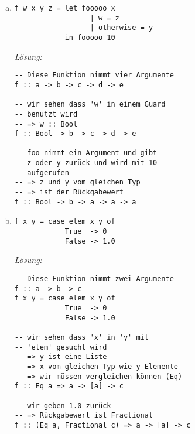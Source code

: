 \documentclass{article}
\begin{document}
\begin{enumerate} [a)]
\begin{mdframed}[backgroundcolor=bg]
\begin{verbatim}
-- wir sehen dass aus 'y' Elemente
-- rausgezogen werden (z <- y)
-- => y ist eine Liste
f :: a -> [b] -> c

-- wir benutzen modulo auf x und z
-- => beide von Integral
-- => gleicher Typ
f :: Integral a => a -> [a] -> c

-- Wir geben eine Liste zurück mit
-- Elementen aus 'y'
f :: Integral a => a -> [a] -> [a]
         \end{verbatim}
    \end{mdframed}

\newpage

    \item \begin{verbatim}
f w x y z = let fooooo x
                  | w = z
                  | otherwise = y
            in fooooo 10
          \end{verbatim}

    \textit{Lösung:}
    \begin{mdframed}[backgroundcolor=bg]
        \begin{verbatim}
-- Diese Funktion nimmt vier Argumente
f :: a -> b -> c -> d -> e

-- wir sehen dass 'w' in einem Guard
-- benutzt wird
-- => w :: Bool
f :: Bool -> b -> c -> d -> e

-- foo nimmt ein Argument und gibt
-- z oder y zurück und wird mit 10
-- aufgerufen
-- => z und y vom gleichen Typ
-- => ist der Rückgabewert
f :: Bool -> b -> a -> a -> a
         \end{verbatim}
    \end{mdframed}

    \item \begin{verbatim}
f x y = case elem x y of
            True  -> 0
            False -> 1.0
          \end{verbatim}

    \textit{Lösung:}
    \begin{mdframed}[backgroundcolor=bg]
        \begin{verbatim}
-- Diese Funktion nimmt zwei Argumente
f :: a -> b -> c
f x y = case elem x y of
            True  -> 0
            False -> 1.0

-- wir sehen dass 'x' in 'y' mit
-- 'elem' gesucht wird
-- => y ist eine Liste
-- => x vom gleichen Typ wie y-Elemente
-- => wir müssen vergleichen können (Eq)
f :: Eq a => a -> [a] -> c

-- wir geben 1.0 zurück
-- => Rückgabewert ist Fractional
f :: (Eq a, Fractional c) => a -> [a] -> c
         \end{verbatim}
    \end{mdframed}


\end{enumerate}
\end{document}
